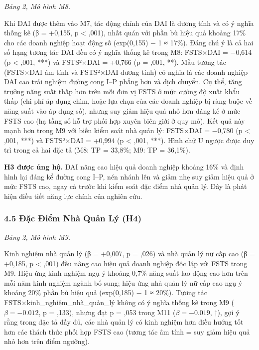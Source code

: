 \documentclass[12pt,a4paper]{article}
\begin{document}
\emph{Bảng 2, Mô hình M8.}

Khi DAI được thêm vào M7, tác động chính của DAI là dương tính và có ý
nghĩa thống kê (β = +0,155, p \textless{} ,001), nhất quán với phần bù
hiệu quả khoảng 17\% cho các doanh nghiệp hoạt động số (exp(0,155) − 1 ≈
17\%). Đáng chú ý là cả hai số hạng tương tác DAI đều có ý nghĩa thống
kê trong M8: FSTS×DAI = −0,614 (p \textless{} ,001, ***) và FSTS²×DAI =
+0,766 (p = ,001, **). Mẫu tương tác (FSTS×DAI âm tính và FSTS²×DAI
dương tính) có nghĩa là các doanh nghiệp DAI cao trải nghiệm đường cong
I--P phẳng hơn và dịch chuyển. Cụ thể, tăng trưởng năng suất thấp hơn
trên mỗi đơn vị FSTS ở mức cường độ xuất khẩu thấp (chi phí áp dụng
chìm, hoặc lựa chọn của các doanh nghiệp bị ràng buộc về năng suất vào
áp dụng số), nhưng suy giảm hiệu quả nhỏ hơn đáng kể ở mức FSTS cao (hạ
tầng số hỗ trợ phối hợp xuyên biên giới ở quy mô). Kết quả này mạnh hơn
trong M9 với biến kiểm soát nhà quản lý: FSTS×DAI = −0,780 (p
\textless{} ,001, ***) và FSTS²×DAI = +0,994 (p \textless{} ,001, ***).
Hình chữ U ngược được duy trì trong cả hai đặc tả (M8: TP = 33,8\%; M9:
TP = 36,1\%).

\textbf{H3 được ủng hộ.} DAI nâng cao hiệu quả doanh nghiệp khoảng 16\%
và định hình lại đáng kể đường cong I--P, nén nhánh lên và giảm nhẹ suy
giảm hiệu quả ở mức FSTS cao, ngay cả trước khi kiểm soát đặc điểm nhà
quản lý. Đây là phát hiện điều tiết năng lực chính của nghiên cứu.

\hypertarget{45-ux111ux1eb7c-ux111iux1ec3m-nhuxe0-quux1ea3n-luxfd-h4}{%
\subsubsection{4.5 Đặc Điểm Nhà Quản Lý
(H4)}\label{45-ux111ux1eb7c-ux111iux1ec3m-nhuxe0-quux1ea3n-luxfd-h4}}

\emph{Bảng 2, Mô hình M9.}

Kinh nghiệm nhà quản lý (β = +0,007, p = ,026) và nhà quản lý nữ cấp cao
(β = +0,185, p \textless{} ,001) đều nâng cao hiệu quả doanh nghiệp độc
lập với FSTS trong M9. Hiệu ứng kinh nghiệm ngụ ý khoảng 0,7\% năng suất
lao động cao hơn trên mỗi năm kinh nghiệm ngành bổ sung; hiệu ứng nhà
quản lý nữ cấp cao ngụ ý khoảng 20\% phần bù hiệu quả (exp(0,185) − 1 ≈
20\%). Tương tác FSTS×kinh\_nghiệm\_nhà\_quản\_lý không có ý nghĩa thống
kê trong M9 (\(\beta = −0.012\), p = ,133), nhưng đạt p = ,053 trong M11
(\(\beta = −0.019\), †), gợi ý rằng trong đặc tả đầy đủ, các nhà quản lý
có kinh nghiệm hơn điều hướng tốt hơn các thách thức phối hợp FSTS cao
(tương tác âm tính = suy giảm hiệu quả nhỏ hơn trên điểm ngưỡng).
\end{document}
